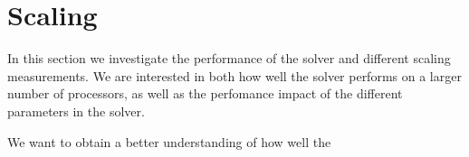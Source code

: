\section{Scaling}
  In this section we investigate the performance of the solver and different scaling
  measurements. We are interested in both how well the solver performs on a larger
  number of processors, as well as the perfomance impact of the different
  parameters in the solver.

  We want to obtain a better understanding of how well the 

